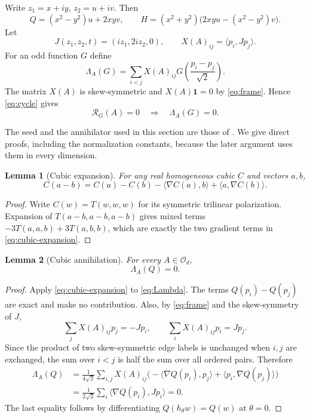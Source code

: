 \documentclass[11pt,reqno]{amsart}
\newtheorem{lemma}[lemma]{Lemma}
\theoremstyle{definition}
\theoremstyle{remark}
\numberwithin{equation}{section}
\newcommand{\one}{\mathbf 1}
\newcommand{\Orth}{\mathcal O_d}
\newcommand{\ip}[2]{\langle #1,#2\rangle}
\begin{document}
Write $z_1=x+iy$, $z_2=u+iv$. Then
\begin{equation}\label{eq:real-seed}
 Q=(x^2-y^2)u+2xyv,\qquad
 H=(x^2+y^2)\bigl(2xyu-(x^2-y^2)v\bigr).
\end{equation}
Let
\[
 J(z_1,z_2,t)=(iz_1,2iz_2,0),\qquad
 X(A)_{ij}=\ip{p_i}{Jp_j}.
\]
For an odd function $G$ define
\begin{equation}\label{eq:Lambda}
 \Lambda_A(G)=\sum_{i<j}X(A)_{ij}
                     G\!\left(\frac{p_i-p_j}{\sqrt2}\right).
\end{equation}
The matrix $X(A)$ is skew-symmetric and $X(A)\one=0$ by
\eqref{eq:frame}. Hence \eqref{eq:cycle} gives
\begin{equation}\label{eq:exact-Lambda}
 \mathcal R_G(A)=0\quad\Longrightarrow\quad\Lambda_A(G)=0.
\end{equation}

The seed and the annihilator used in this section are those of
\cite{ChatGPT2026}. We give direct proofs, including the normalization
constants, because the later argument uses them in every dimension.

\begin{lemma}[Cubic expansion]\label{lem:cubic-expansion}
For any real homogeneous cubic $C$ and vectors $a,b$,
\begin{equation}\label{eq:cubic-expansion}
 C(a-b)=C(a)-C(b)-\ip{\nabla C(a)}b+\ip a{\nabla C(b)}.
\end{equation}
\end{lemma}
\begin{proof}
Write $C(w)=T(w,w,w)$ for its symmetric trilinear polarization.
Expansion of $T(a-b,a-b,a-b)$ gives mixed terms
$-3T(a,a,b)+3T(a,b,b)$, which are exactly the two gradient terms
in \eqref{eq:cubic-expansion}.
\end{proof}

\begin{lemma}[Cubic annihilation]\label{lem:annihilator}
For every $A\in\Orth$,
\begin{equation}\label{eq:cubic-annihilation}
 \Lambda_A(Q)=0.
\end{equation}
\end{lemma}
\begin{proof}
Apply \eqref{eq:cubic-expansion} to \eqref{eq:Lambda}. The terms
$Q(p_i)-Q(p_j)$ are exact and make no contribution. Also,
by \eqref{eq:frame} and the skew-symmetry of $J$,
\[
 \sum_jX(A)_{ij}p_j=-Jp_i,\qquad
 \sum_iX(A)_{ij}p_i=Jp_j.
\]
Since the product of two skew-symmetric edge labels is unchanged
when $i,j$ are exchanged, the sum over $i<j$ is half the sum
over all ordered pairs. Therefore
\begin{align*}
 \Lambda_A(Q)
 &=\frac1{4\sqrt2}\sum_{i,j}X(A)_{ij}
    \bigl(-\ip{\nabla Q(p_i)}{p_j}
                 +\ip{p_i}{\nabla Q(p_j)}\bigr)\\
 &=\frac1{2\sqrt2}\sum_i\ip{\nabla Q(p_i)}{Jp_i}=0.
\end{align*}
The last equality follows by differentiating
$Q(h_\theta w)=Q(w)$ at $\theta=0$.
\end{proof}
\end{document}
